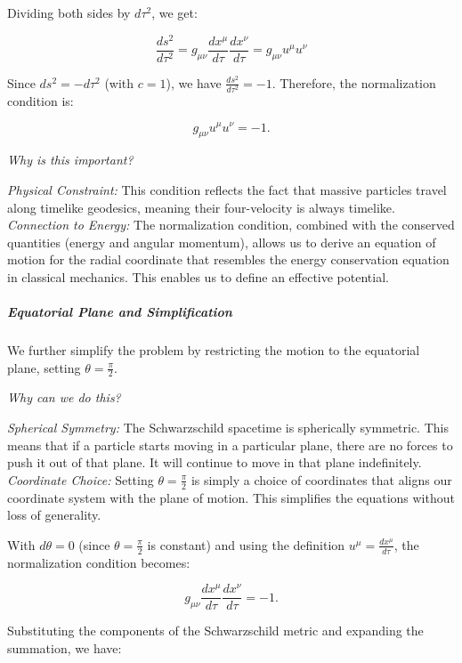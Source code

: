 Dividing both sides by \(d\tau^2\), we get:

\begin{equation}
\frac{ds^2}{d\tau^2} = g_{\mu\nu} \frac{dx^\mu}{d\tau} \frac{dx^\nu}{d\tau} = g_{\mu\nu}u^\mu u^\nu
\end{equation}

Since \(ds^2 = -d\tau^2\) (with $c=1$), we have \(\frac{ds^2}{d\tau^2} = -1\). Therefore, the normalization condition is:

\begin{equation}
g_{\mu\nu}u^\mu u^\nu = -1.
\end{equation}

\textit{Why is this important?}

\textit{Physical Constraint:} This condition reflects the fact that massive particles travel along timelike geodesics, meaning their four-velocity is always timelike.\\
\textit{Connection to Energy:} The normalization condition, combined with the conserved quantities (energy and angular momentum), allows us to derive an equation of motion for the radial coordinate that resembles the energy conservation equation in classical mechanics. This enables us to define an effective potential.

\subparagraph{Equatorial Plane and Simplification}

We further simplify the problem by restricting the motion to the equatorial plane, setting \(\theta = \frac{\pi}{2}\).

\textit{Why can we do this?}

\textit{Spherical Symmetry:} The Schwarzschild spacetime is spherically symmetric. This means that if a particle starts moving in a particular plane, there are no forces to push it out of that plane. It will continue to move in that plane indefinitely.
\textit{Coordinate Choice:} Setting \(\theta = \frac{\pi}{2}\) is simply a choice of coordinates that aligns our coordinate system with the plane of motion. This simplifies the equations without loss of generality.

With \(d\theta = 0\) (since \(\theta = \frac{\pi}{2}\) is constant) and using the definition \(u^\mu = \frac{dx^\mu}{d\tau}\), the normalization condition becomes:

\begin{equation}
g_{\mu\nu} \frac{dx^\mu}{d\tau} \frac{dx^\nu}{d\tau} = -1.
\end{equation}

Substituting the components of the Schwarzschild metric and expanding the summation, we have:


